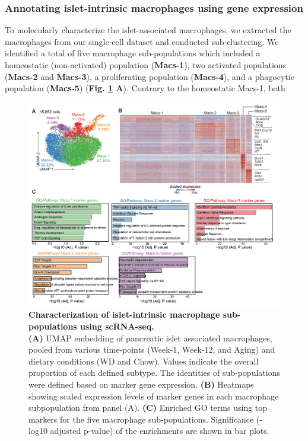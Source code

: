 
\subsubsection{Annotating islet-intrinsic macrophages using gene expression}
To molecularly characterize the islet-associated macrophages, we extracted the macrophages from our single-cell dataset and conducted sub-clustering. We identified a total of five macrophage sub-populations which included a homeostatic (non-activated) population (\textbf{Macs-1}), two activated populations (\textbf{Macs-2} and \textbf{Macs-3}), a proliferating population (\textbf{Macs-4}), and a phagocytic population (\textbf{Macs-5}) (\textbf{Fig. \ref{fig2-5-1} A}). Contrary to the homeostatic Macs-1, both

\begin{figure}[H]
\centering
\includegraphics[width=\linewidth]{Chapter4/Fig/F2-5-01.png}
\caption[res-macs1]{\textbf{Characterization of islet-intrinsic macrophage sub-populations using scRNA-seq.}\\
\textbf{(A)} UMAP embedding of pancreatic islet associated macrophages, pooled from various time-points (Week-1, Week-12, and Aging) and dietary conditions (WD and Chow). Values indicate the overall proportion of each defined subtype. The identities of sub-populations were defined based on marker gene expression. \textbf{(B)} Heatmaps showing scaled expression levels of marker genes in each macrophage subpopulation from panel (A). \textbf{(C)} Enriched GO terms using top markers for the five macrophage sub-populations. Significance (-log10 adjusted p-value) of the enrichments are shown in bar plots.}
\label{fig2-5-1}
\end{figure}


